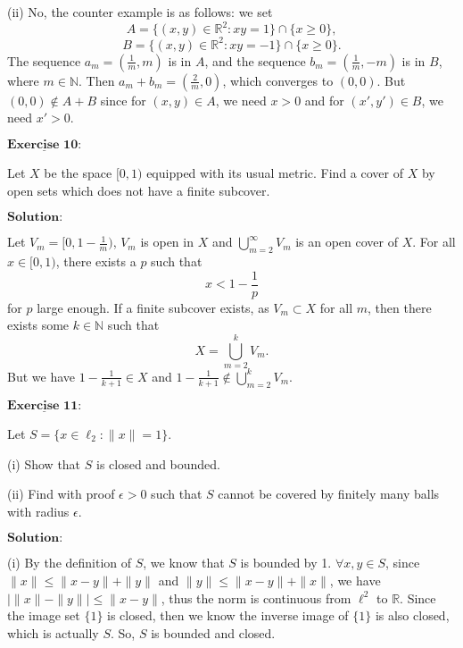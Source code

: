 \documentclass[12pt,a4paper]{ctexart}
\begin{document}
(ii) No, the counter example is as follows: we set
$$A = \{(x, y) \in \mathbb R^2: x y = 1\} \cap \{x \geq 0\},$$
$$B = \{(x, y) \in \mathbb R^2: x y = - 1\} \cap \{x \geq 0\}.$$
The sequence $a_m = (\frac{1}{m}, m)$ is in $A$, and the sequence $b_m = (\frac{1}{m}, - m)$ is in $B$, where $m \in \mathbb N$. Then $a_m + b_m = (\frac{2}{m}, 0)$, which converges to $(0,0)$. But $(0,0) \notin A + B$ since for $(x, y) \in A$, we need $x > 0$ and for $(x', y') \in B$, we need $x' > 0$.



\newpage

$\underline{\textbf{Exercise 10:}}$

Let $X$ be the space $[0,1)$ equipped with its usual metric. Find a cover of $X$ by open sets which does not have a finite subcover.

\vspace{8pt}
$\textbf{Solution:}$

Let $V_m = [0, 1 - \frac{1}{m})$, $V_m$ is open in $X$ and $\bigcup_{m=2}^{\infty} V_m$ is an open cover of $X$. For all $x \in [0,1)$, there exists a $p$ such that 
$$x < 1 - \frac{1}{p}$$
for $p$ large enough. If a finite subcover exists, as $V_m \subset X$ for all $m$, then there exists some $k \in \mathbb N$ such that
$$X = \bigcup_{m = 2}^{k} V_m.$$
But we have $1 - \frac{1}{k+1} \in X$ and $1 - \frac{1}{k+1} \notin \bigcup_{m = 2}^{k} V_m$. 



\newpage

$\underline{\textbf{Exercise 11:}}$

Let $S = \{x \in \ell_2: \|x\| = 1 \}$.

(i) Show that $S$ is closed and bounded.

(ii) Find with proof $\epsilon > 0$ such that $S$ cannot be covered by finitely many balls with radius $\epsilon$.

\vspace{8pt}
$\textbf{Solution:}$

(i) By the definition of $S$, we know that $S$ is bounded by 1. $\forall x, y \in S$, since $\|x\| \leq \|x - y \| + \|y\|$ and $\|y\| \leq \|x - y \| + \|x\|$, we have $| \|x\| - \|y\| | \leq \|x - y\|$, thus the norm is continuous from $\ell^{2}$ to $\mathbb{R}$. Since the image set $\{1\}$ is closed, then we know the inverse image of $\{1\}$ is also closed, which is actually $S$. So, $S$ is bounded and closed.
\end{document}
